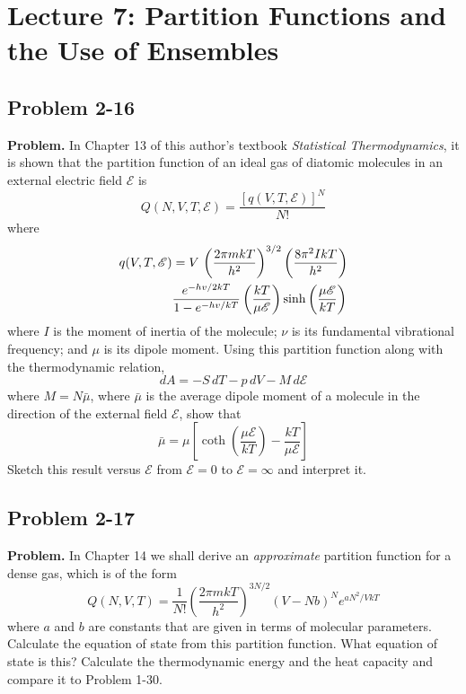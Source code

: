 \documentclass[twocolumn, 10pt]{article}
\numberwithin{equation}{section}
\newenvironment{problem}
{\par\medskip\sffamily \color{problue}
  \textbf{Problem. }\ignorespaces}
{\medskip}
\begin{document}
\section{Lecture 7: Partition Functions and the Use of Ensembles}

\subsection{Problem 2-16}

\begin{problem}
In Chapter 13 of this author's textbook
\emph{Statistical Thermodynamics},
it is shown that the partition function of an ideal gas of diatomic molecules
in an external electric field $\mathscr E$ is
$$
Q(N, V, T, \mathscr E) = \frac{ [q(V, T, \mathscr E)]^N } { N! }
$$
where
\begin{align}
  q(V, T, \mathscr E)
  &= V \, \left( \frac{ 2 \pi m k T } { h^2 } \right)^{3/2}
  \left( \frac{ 8\pi^2 I k T } { h^2 } \right)
  \notag \\
  &\frac{ e^{-hv/2kT} } { 1 - e^{-hv/kT} }
  \left( \frac{ kT } { \mu \mathscr E } \right)
  \sinh\left( \frac{ \mu \mathscr E } { k T } \right)
\end{align}
%
where $I$ is the moment of inertia of the molecule;
$\nu$ is its fundamental vibrational frequency;
and $\mu$ is its dipole moment.
%
Using this partition function along with
the thermodynamic relation,
$$
dA = -S \, dT - p \, dV - M \, d\mathscr E
$$
where $M = N \bar\mu$,
where $\bar\mu$ is the average dipole moment
of a molecule in the direction of the external field $\mathscr E$,
show that
$$
\bar\mu = \mu \left[
  \coth\left( \frac{ \mu \mathscr E } { k T } \right)
  -\frac{ k T } { \mu \mathscr E }
  \right]
$$
Sketch this result versus $\mathscr E$
from $\mathscr E = 0$ to $\mathscr E = \infty$
and interpret it.
\end{problem}


\subsection{Problem 2-17}

\begin{problem}
In Chapter 14 we shall derive an \emph{approximate}
partition function for a dense gas,
which is of the form
$$
  Q(N, V, T)
  =
  \frac{1}{N!}
  \left( \frac{ 2\pi m k T }{ h^2 } \right)^{3N/2}
  (V - N b)^N e^{a N^2/V k T}
$$
where $a$ and $b$ are constants that are given
in terms of molecular parameters.
%
Calculate the equation of state from this partition function.
%
What equation of state is this?
%
Calculate the thermodynamic energy and the heat capacity
and compare it to Problem 1-30.
\end{problem}
\end{document}
